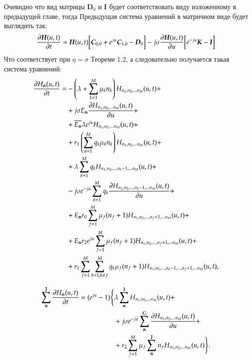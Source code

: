 Очевидно что вид матрицы \(\boldsymbol{D}_0\) и \(\boldsymbol{I}\) 
будет соответствовать виду изложенному в предыдущей главе, тогда
Предыдущая система уравнений в матричном виде будет выглядить так:
\begin{equation}
    \pdv{\boldsymbol{H}(u,t)}{t} =
    \boldsymbol{H}(u,t)\bigg[\boldsymbol{C}_{0,0} + e^{ju}\boldsymbol{C}_{1,0} - \boldsymbol{D}_{0}\bigg]
    -j\sigma\pdv{\boldsymbol{H}(u,t)}{u}\bigg[e^{-ju}\boldsymbol{K} - \boldsymbol{I}\bigg]
\end{equation}
Что соответствует при \(\eta = \sigma\) Теореме 1.2, а следовательно получается такая система уравнений:
\begin{equation}\begin{aligned} \label{HFirstEquationParticular}
\pdv{{H}_{\bold{n}}(u,t)}{t}=
    &-\left( {\lambda+\sum_{{k}=1}^{M}\mu_{k}{n}_{k}} \right){H}_{{n}_1, {n}_2, ... {n}_{M}}(u,t)+\\
    &+j \sigma E_{\bold{n}} \pdv{ {H}_{{n}_1, {n}_2, ... {n}_{M}} (u,t)}{u}(i,t) + \\
    &+\overline{E_{\bold{n}}} \lambda e^{ju} {H}_{{n}_1, {n}_2, ... {n}_{M}}(u,t)+\\
    &+r_1 \left( {\sum_{{k}=1}^{M} q_{k}\mu_{k}{n}_{k}} \right) {H}_{{n}_1, {n}_2, ... {n}_{M}}(u,t) + \\
    &+\lambda\sum_{k=1}^{M}q_k {H}_{{n}_1, {n}_2, ... , {n}_{k} - 1, ... {n}_{M}}(u,t) + \\
    &-j \sigma  e^{-ju} \sum_{k=1}^{M}q_k \pdv{ {H}_{{n}_1, {n}_2, ... , {n}_{k} - 1, ... {n}_{M}} (u,t)}{u} + \\
    &+E_{\bold{n}} r_0 \sum_{f=1}^{M} \mu_f (n_f + 1) {H}_{{n}_1, {n}_2, ... , {n}_{f} + 1, ... {n}_{M}}(u,t) + \\
    &+E_{\bold{n}} r_2 e^{ju} \sum_{f=1}^{M} \mu_f (n_f + 1) {H}_{{n}_1, {n}_2, ... , {n}_{f} + 1, ... {n}_{M}}(u,t) + \\
    &+r_1 \sum_{{f}=1}^{M} \sum_{{k}=1, {k} \neq {f}}^{M}
        q_k \mu_f (n_f+1) {H}_{{n}_1, {n}_2, ... , {n}_{k} - 1, ... , {n}_{f} + 1, ... {n}_{M}}(u,t),
\end{aligned}\end{equation}

\begin{equation}\begin{aligned}\label{HSecondEquationParticular}
\sum_{\bold{n}}^{\mathbb{J}} \pdv{{H}_{\bold{n}}(u,t)}{t}=(e^{ju} - 1)
\Bigg\{
    &\lambda \sum_{\bold{n}}^{\mathbb{I}} {H}_{{n}_1, {n}_2, ... {n}_{M}}(u,t)+\\
    &+j\sigma e^{-ju} \sum_{\bold{n}}^{\mathbb{G}}\pdv{ {H}_{{n}_1, {n}_2, ... {n}_{M}} (u,t)}{u} + \\
    &+r_2\sum_{f=1}^{M} \mu_f \sum_{\bold{n}}^{\mathbb{J}} n_f {H}_{{n}_1, {n}_2, ... {n}_{M}}(u,t)
\Bigg\}
.
\end{aligned}\end{equation}


